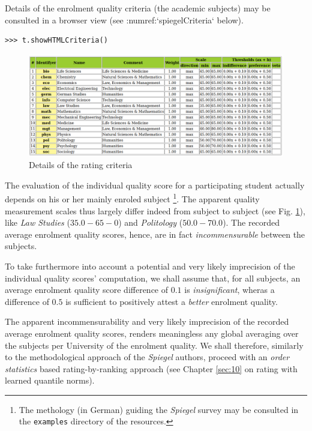 Details of the enrolment quality criteria (the academic subjects) may be consulted in a browser view (see :numref:`spiegelCriteria` below).

\begin{lstlisting}
>>> t.showHTMLCriteria()
\end{lstlisting}
 
\begin{figure}[h]
\includegraphics[width=12cm]{Figures/spiegelCriteria.png}
\caption{Details of the rating criteria}
\label{fig:14.2}       %
\end{figure}
The evaluation of the individual quality score for a participating student actually depends on his or her mainly enroled subject \footnote{The methology (in German) guiding the \emph{Spiegel} survey may be consulted in the \texttt{examples} directory of the \Digraph resources.}. The apparent quality measurement scales thus largely differ indeed from subject to subject (see Fig. \ref{fig:14.2}), like \emph{Law Studies} ($35.0 - 65-0$) and \emph{Politology} ($50.0 - 70.0$). The recorded average enrolment quality scores, hence, are in fact \emph{incommensurable} between the subjects.

To take furthermore into account a potential and very likely imprecision of the individual quality scores' computation, we shall assume that, for all subjects, an average enrolment quality score difference of $0.1$ is \emph{insignificant}, wheras a difference of $0.5$ is sufficient to positively attest a \emph{better} enrolment quality.

The apparent incommensurability and very likely imprecision of the recorded average enrolment quality scores, renders meaningless any global averaging over the subjects per University of the enrolment quality. We shall therefore, similarly to the methodological approach of the \emph{Spiegel} authors, proceed with an \emph{order statistics} based rating-by-ranking approach (see Chapter \ref{sec:10} on rating with learned quantile norms).

